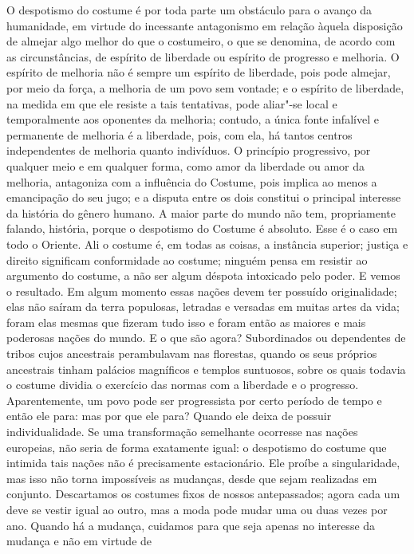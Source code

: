 O despotismo do costume é por toda parte um obstáculo para o avanço da
humanidade, em virtude do incessante antagonismo em relação àquela
disposição de almejar algo melhor do que o costumeiro, o que se
denomina, de acordo com as circunstâncias, de espírito de liberdade ou
espírito de progresso e melhoria. O espírito de melhoria não é sempre
um espírito de liberdade, pois pode almejar, por meio da força, a
melhoria de um povo sem vontade; e o espírito de liberdade, na medida
em que ele resiste a tais tentativas, pode aliar"-se local e
temporalmente aos oponentes da melhoria; contudo, a única fonte
infalível e permanente de melhoria é a liberdade, pois, com ela, há
tantos centros independentes de melhoria quanto indivíduos. O princípio
progressivo, por qualquer meio e em qualquer forma, como amor da
liberdade ou amor da melhoria, antagoniza com a influência do Costume,
pois implica ao menos a emancipação do seu jugo; e a disputa entre os
dois constitui o principal interesse da história do gênero humano. A
maior parte do mundo não tem, propriamente falando, história, porque o
despotismo do Costume é absoluto. Esse é o caso em todo o Oriente. Ali
o costume é, em todas as coisas, a instância superior; justiça e
direito significam conformidade ao costume; ninguém pensa em resistir
ao argumento do costume, a não ser algum déspota intoxicado pelo poder.
E vemos o resultado. Em algum momento essas nações devem ter possuído
originalidade; elas não saíram da terra populosas, letradas e versadas
em muitas artes da vida; foram elas mesmas que fizeram tudo isso e
foram então as maiores e mais poderosas nações do mundo. E o que são
agora? Subordinados ou dependentes de tribos cujos ancestrais
perambulavam nas florestas, quando os seus próprios ancestrais tinham
palácios magníficos e templos suntuosos, sobre os quais todavia o
costume dividia o exercício das normas com a liberdade e o progresso.
Aparentemente, um povo pode ser progressista por certo período de tempo
e então ele para: mas por que ele para? Quando ele deixa de possuir
individualidade. Se uma transformação semelhante ocorresse nas nações
europeias, não seria de forma exatamente igual: o despotismo do costume
que intimida tais nações não é precisamente estacionário. Ele proíbe a
singularidade, mas isso não torna impossíveis as mudanças, desde que
sejam realizadas em conjunto. Descartamos os costumes fixos de nossos
antepassados; agora cada um deve se vestir igual ao outro, mas a moda
pode mudar uma ou duas vezes por ano. Quando há a mudança, cuidamos
para que seja apenas no interesse da mudança e não em virtude de

